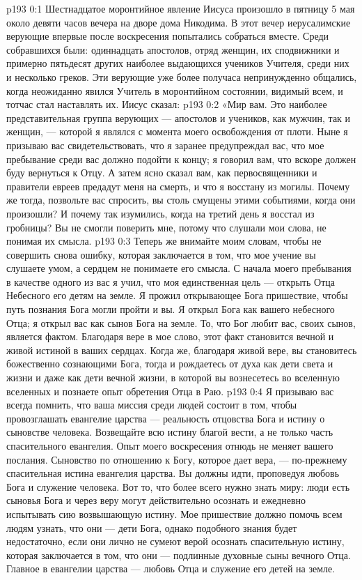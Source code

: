 \author{Комиссия срединников}
\vs p193 0:1 Шестнадцатое моронтийное явление Иисуса произошло в пятницу 5 мая около девяти часов вечера на дворе дома Никодима. В этот вечер иерусалимские верующие впервые после воскресения попытались собраться вместе. Среди собравшихся были: одиннадцать апостолов, отряд женщин, их сподвижники и примерно пятьдесят других наиболее выдающихся учеников Учителя, среди них и несколько греков. Эти верующие уже более получаса непринужденно общались, когда неожиданно явился Учитель в моронтийном состоянии, видимый всем, и тотчас стал наставлять их. Иисус сказал:
\vs p193 0:2 \pc «Мир вам. Это наиболее представительная группа верующих --- апостолов и учеников, как мужчин, так и женщин, --- которой я являлся с момента моего освобождения от плоти. Ныне я призываю вас свидетельствовать, что я заранее предупреждал вас, что мое пребывание среди вас должно подойти к концу; я говорил вам, что вскоре должен буду вернуться к Отцу. А затем ясно сказал вам, как первосвященники и правители евреев предадут меня на смерть, и что я восстану из могилы. Почему же тогда, позвольте вас спросить, вы столь смущены этими событиями, когда они произошли? И почему так изумились, когда на третий день я восстал из гробницы? Вы не смогли поверить мне, потому что слушали мои слова, не понимая их смысла.
\vs p193 0:3 Теперь же внимайте моим словам, чтобы не совершить снова ошибку, которая заключается в том, что мое учение вы слушаете умом, а сердцем не понимаете его смысла. С начала моего пребывания в качестве одного из вас я учил, что моя единственная цель --- открыть Отца Небесного его детям на земле. Я прожил открывающее Бога пришествие, чтобы путь познания Бога могли пройти и вы. Я открыл Бога как вашего небесного Отца; я открыл вас как сынов Бога на земле. То, что Бог любит вас, своих сынов, является фактом. Благодаря вере в мое слово, этот факт становится вечной и живой истиной в ваших сердцах. Когда же, благодаря живой вере, вы становитесь божественно сознающими Бога, тогда и рождаетесь от духа как дети света и жизни и даже как дети вечной жизни, в которой вы вознесетесь во вселенную вселенных и познаете опыт обретения Отца в Раю.
\vs p193 0:4 Я призываю вас всегда помнить, что ваша миссия среди людей состоит в том, чтобы провозглашать евангелие царства --- реальность отцовства Бога и истину о сыновстве человека. Возвещайте всю истину благой вести, а не только часть спасительного евангелия. Опыт моего воскресения отнюдь не меняет вашего послания. Сыновство по отношению к Богу, которое дает вера, --- по\hyp{}прежнему спасительная истина евангелия царства. Вы должны идти, проповедуя любовь Бога и служение человека. Вот то, что более всего нужно знать миру: люди есть сыновья Бога и через веру могут действительно осознать и ежедневно испытывать сию возвышающую истину. Мое пришествие должно помочь всем людям узнать, что они --- дети Бога, однако подобного знания будет недостаточно, если они лично не сумеют верой осознать спасительную истину, которая заключается в том, что они --- подлинные духовные сыны вечного Отца. Главное в евангелии царства --- любовь Отца и служение его детей на земле.
